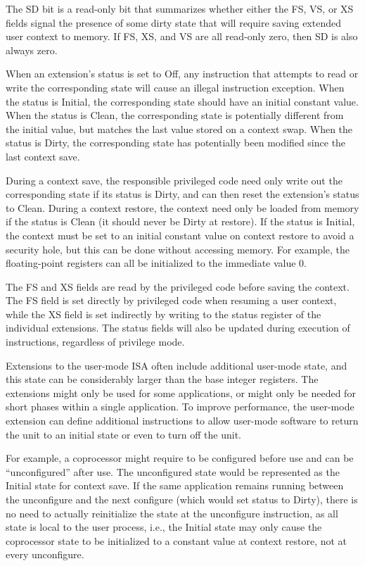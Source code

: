 The SD bit is a read-only bit that summarizes whether either the FS,
VS, or XS fields signal the presence of some dirty state that will
require saving extended user context to memory.  If FS, XS, and VS are all
read-only zero, then SD is also always zero.

When an extension's status is set to Off, any instruction that
attempts to read or write the corresponding state will cause an illegal instruction
exception.  When the status is Initial, the corresponding state should
have an initial constant value.  When the status is Clean, the
corresponding state is potentially different from the initial value,
but matches the last value stored on a context swap.  When the status
is Dirty, the corresponding state has potentially been modified since
the last context save.

During a context save, the responsible privileged code need only write
out the corresponding state if its status is Dirty, and can then reset
the extension's status to Clean.  During a context restore, the
context need only be loaded from memory if the status is Clean (it
should never be Dirty at restore).  If the status is Initial, the
context must be set to an initial constant value on context restore to
avoid a security hole, but this can be done without accessing memory.
For example, the floating-point registers can all be initialized to
the immediate value 0.

The FS and XS fields are read by the privileged code before saving the
context.  The FS field is set directly by privileged code when
resuming a user context, while the XS field is set indirectly by
writing to the status register of the individual extensions.  The
status fields will also be updated during execution of instructions,
regardless of privilege mode.

Extensions to the user-mode ISA often include additional user-mode
state, and this state can be considerably larger than the base integer
registers.  The extensions might only be used for some applications,
or might only be needed for short phases within a single application.
To improve performance, the user-mode extension can define additional
instructions to allow user-mode software to return the unit to an
initial state or even to turn off the unit.

For example, a coprocessor might require to be configured before use
and can be ``unconfigured'' after use.  The unconfigured state would
be represented as the Initial state for context save.  If the same
application remains running between the unconfigure and the next
configure (which would set status to Dirty), there is no need to
actually reinitialize the state at the unconfigure instruction, as all
state is local to the user process, i.e., the Initial state may only
cause the coprocessor state to be initialized to a constant value at
context restore, not at every unconfigure.

